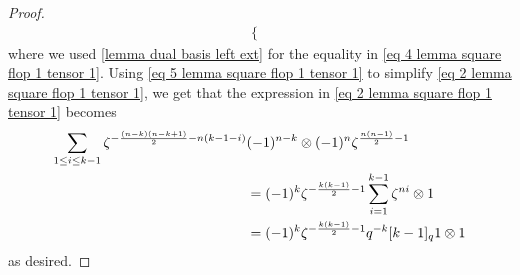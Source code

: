 \begin{proof}
\begin{align}
\begin{cases}
    \end{cases}
    \label{eq 5 lemma square flop 1 tensor 1}  
    \end{align}
    where we used \cref{lemma dual basis left ext} for the equality in \eqref{eq 4 lemma square flop 1 tensor 1}.
    Using \eqref{eq 5 lemma square flop 1 tensor 1} to simplify \eqref{eq 2 lemma square flop 1 tensor 1}, we get that the expression in \eqref{eq 2 lemma square flop 1 tensor 1} becomes
    \begin{align}\notag\sum_{1\leq i \leq k-1}\zeta^{-\frac{(n-k)(n-k+1)}{2}-n(k-1-i)}& (-1)^{n-k} \otimes (-1)^{n}\zeta^{\frac{n(n-1)}{2}-1} \\
   \notag &= (-1)^k \zeta^{-\frac{k(k-1)}{2}-1}\sum_{i=1}^{k-1} \zeta^{ni} \otimes 1\\
    &=(-1)^k\zeta^{-\frac{k(k-1)}{2}-1}q^{-k}[k-1]_q 1\otimes 1 \label{eq 6 lemma square flop 1 tensor 1}
    \end{align}
    as desired.
\end{proof}


